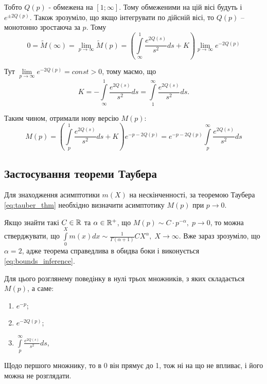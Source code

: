 Тобто $Q(p)$ - обмежена на $[1; \infty]$. Тому обмеженими на цій вісі будуть і $e^{\pm 2Q(p)}$. Також зрозуміло, що якщо інтегрувати по дійсній вісі, то $Q(p)$ – монотонно зростаюча за $p$. Тому
\begin{equation}
	0 = \tilde M(\infty) = \lim_{p\rightarrow \infty} \tilde M(p) = \left( \int\limits_\infty^1 \frac{e^{2Q(s)}}{s^2} ds + K \right) \lim_{p\rightarrow \infty} e^{- 2Q(p)}
\end{equation}

Тут $\lim\limits_{p\rightarrow \infty} e^{- 2Q(p)} = const > 0$, тому маємо, що
\begin{equation}
	K = -  \int\limits_\infty^1 \frac{e^{2Q(s)}}{s^2} ds =  \int\limits_1^\infty \frac{e^{2Q(s)}}{s^2} ds.
\end{equation}

Таким чином, отримали нову версію $M(p)$:
\begin{equation}
	\label{eq:uniform_laplace_sol}
	M(p)= \left( \int\limits_p^1 \frac{e^{2Q(s)}}{s^2} ds + K \right) e^{- p - 2Q(p)} = 
	e^{- p - 2Q(p)} \int\limits_p^\infty \frac{e^{2Q(s)}}{s^2} ds
\end{equation}

\subsection{Застосування теореми Таубера}

Для знаходження асимптотики $m(X)$ на нескінченності, за теоремою Таубера \eqref{eq:tauber_thm} необхідно визначити асимптотику $M(p)$ при $p \rightarrow 0$.

Якщо знайти такі $C \in \mathbb{R}$ та $\alpha \in \mathbb{R}^+$, що $M(p) \sim C \cdot p^{-\alpha}, \; p \rightarrow 0$, то можна стверджувати, що $\int\limits_0^X m(x) dx \sim \frac{1}{\Gamma(\alpha + 1)} C X^\alpha, \; X \rightarrow \infty$. Вже зараз зрозуміло, що $\alpha = 2$, адже теорема справедлива в обидва боки і виконується \eqref{eq:bounds_inference}.

Для цього розглянему поведінку в нулі трьох множників, з яких складається $M(p)$, а саме:
\begin{enumerate}
	\item $e^{-p}$;
	\item $e^{-2Q(p)}$;
	\item $\int\limits_p^\infty \frac{e^{2Q(s)}}{s^2} ds$,
\end{enumerate}

Щодо першого множнику, то в 0 він прямує до 1, тож ні на що не впливає, і його можна не розглядати.

